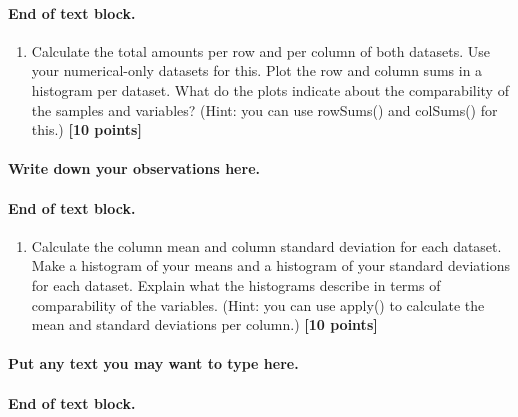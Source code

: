 \documentclass[
]{article}
\providecommand{\tightlist}{%
  \setlength{\itemsep}{0pt}\setlength{\parskip}{0pt}}
\begin{document}
\hypertarget{end-of-text-block.-2}{%
\paragraph{End of text block.}\label{end-of-text-block.-2}}

\begin{enumerate}
\def\labelenumi{\Alph{enumi})}
\setcounter{enumi}{2}
\tightlist
\item
  Calculate the total amounts per row and per column of both datasets.
  Use your numerical-only datasets for this. Plot the row and column
  sums in a histogram per dataset. What do the plots indicate about the
  comparability of the samples and variables? (Hint: you can use
  rowSums() and colSums() for this.) \textbf{{[}10 points{]}}
\end{enumerate}

\hypertarget{write-down-your-observations-here.}{%
\paragraph{Write down your observations
here.}\label{write-down-your-observations-here.}}

\hypertarget{end-of-text-block.-3}{%
\paragraph{End of text block.}\label{end-of-text-block.-3}}

\begin{enumerate}
\def\labelenumi{\Alph{enumi})}
\setcounter{enumi}{3}
\tightlist
\item
  Calculate the column mean and column standard deviation for each
  dataset. Make a histogram of your means and a histogram of your
  standard deviations for each dataset. Explain what the histograms
  describe in terms of comparability of the variables. (Hint: you can
  use apply() to calculate the mean and standard deviations per column.)
  \textbf{{[}10 points{]}}
\end{enumerate}

\hypertarget{put-any-text-you-may-want-to-type-here.-2}{%
\paragraph{Put any text you may want to type
here.}\label{put-any-text-you-may-want-to-type-here.-2}}

\hypertarget{end-of-text-block.-4}{%
\paragraph{End of text block.}\label{end-of-text-block.-4}}
\end{document}
